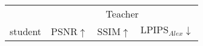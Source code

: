 \documentclass[letterpaper]{article} \usepackage{aaai23}  \usepackage{times}  \usepackage{helvet}  \usepackage{courier}  \usepackage[hyphens]{url}  \usepackage{graphicx} \urlstyle{rm} \def\UrlFont{\rm}  \usepackage{natbib}  \usepackage{caption} \frenchspacing  \setlength{\pdfpagewidth}{8.5in}  \setlength{\pdfpageheight}{11in}  \usepackage{multirow}
\begin{document}
\begin{table*}[t]
\centering
\begin{tabular}{c|cccccccccccc}
\hline
                         & \multicolumn{12}{c}{Teacher}                                                                                                                                                                                                                                                                                                                                                                                                                                                                                                                                                                                                                                                                                             \\ \cline{2-13} 
\multirow{2}{*}{student} & \multicolumn{4}{c|}{PSNR$\uparrow$}                                                                                                                                                                                                                     & \multicolumn{4}{c|}{SSIM$\uparrow $}                                                                                                                                                                                                                     & \multicolumn{4}{c}{$\text{LPIPS}_{Alex}\downarrow$}                                                                                                                                                                                           \\

\end{tabular}
\end{table*}
\end{document}
